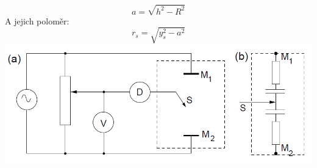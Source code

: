 \documentclass[a4paper,11pt]{article}
\begin{document}
\begin{minipage}[]{0.5\textwidth}
\begin{equation}
                a = \sqrt{h^2 - R^2}
            \end{equation}
            A jejich poloměr:
            \begin{equation}
                r_s = \sqrt{y_s^2 - a^2}
            \end{equation}
            \centering
            \includegraphics[scale=0.35]{Střídavý můstek pro měření v elektrolytické vaně (a). Náhradní schéma elektrolytické vany (b)}
            \captionsetup{justification=centering, font=footnotesize}
            \label{fig:Střídavý můstek pro měření v elektrolytické vaně (a). Náhradní schéma elektrolytické vany (b)}
            \vspace{10pt}
    \end{minipage}
    \hspace{10pt}
\end{document}
